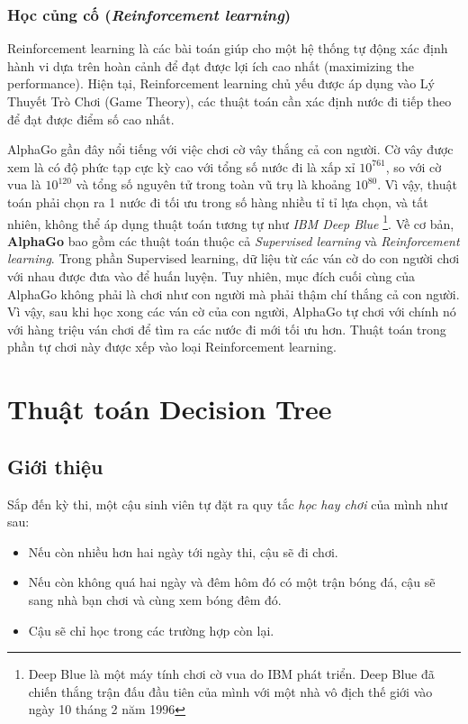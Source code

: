 \documentclass[../main-report.tex]{subfiles}
\begin{document}
\subsubsection{Học củng cố (\emph{Reinforcement learning})}
Reinforcement learning là các bài toán giúp cho một hệ thống tự động xác định hành vi dựa trên hoàn cảnh để đạt được lợi ích cao nhất (maximizing the performance). Hiện tại, Reinforcement learning chủ yếu được áp dụng vào Lý Thuyết Trò Chơi (Game Theory), các thuật toán cần xác định nước đi tiếp theo để đạt được điểm số cao nhất.

\begin{example}
AlphaGo gần đây nổi tiếng với việc chơi cờ vây thắng cả con người. Cờ vây được xem là có độ phức tạp cực kỳ cao với tổng số nước đi là xấp xỉ \(10^{761} \), so với cờ vua là \(10^{120} \) và tổng số nguyên tử trong toàn vũ trụ là khoảng \(10^{80}\). Vì vậy, thuật toán phải chọn ra 1 nước đi tối ưu trong số hàng nhiều tỉ tỉ lựa chọn, và tất nhiên, không thể áp dụng thuật toán tương tự như \emph{IBM Deep Blue} \footnote{Deep Blue là một máy tính chơi cờ vua do IBM phát triển. Deep Blue đã chiến thắng trận đấu đầu tiên của mình với một nhà vô địch thế giới vào ngày 10 tháng 2 năm 1996}. Về cơ bản, \textbf{AlphaGo} bao gồm các thuật toán thuộc cả \emph{Supervised learning} và \emph{Reinforcement learning}. Trong phần Supervised learning, dữ liệu từ các ván cờ do con người chơi với nhau được đưa vào để huấn luyện. Tuy nhiên, mục đích cuối cùng của AlphaGo không phải là chơi như con người mà phải thậm chí thắng cả con người. Vì vậy, sau khi học xong các ván cờ của con người, AlphaGo tự chơi với chính nó với hàng triệu ván chơi để tìm ra các nước đi mới tối ưu hơn. Thuật toán trong phần tự chơi này được xếp vào loại Reinforcement learning. 
\end{example}
\section{Thuật toán Decision Tree}
\subsection{Giới thiệu}
Sắp đến kỳ thi, một cậu sinh viên tự đặt ra quy tắc \textit{học hay chơi} của mình như sau:

\begin{itemize}
\item Nếu còn nhiều hơn hai ngày tới ngày thi, cậu sẽ đi chơi.
\item Nếu còn không quá hai ngày và đêm hôm đó có một trận bóng đá, cậu sẽ sang nhà bạn chơi và cùng xem bóng đêm đó.
\item Cậu sẽ chỉ học trong các trường hợp còn lại.
\end{itemize}
\end{document}
